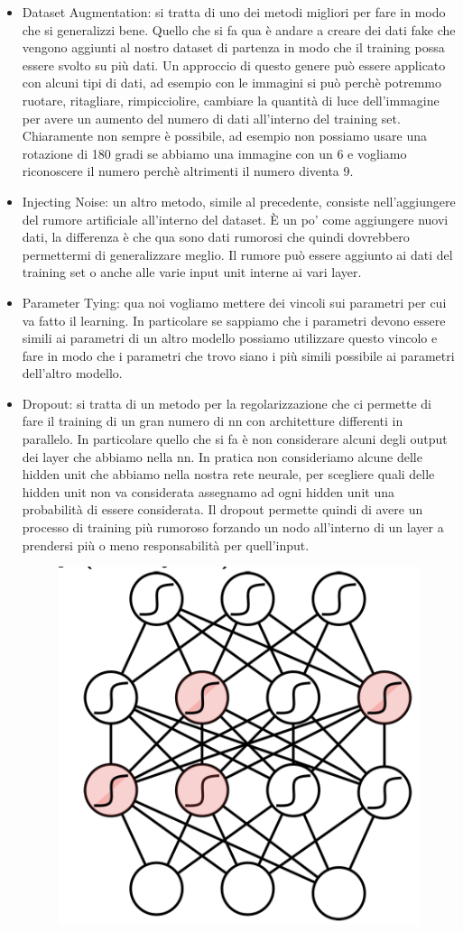 \documentclass[14pt]{extreport}
\begin{document}
\begin{itemize}
	\item Dataset Augmentation: si tratta di uno dei metodi migliori per fare in modo 
	che si generalizzi bene. Quello che si fa qua è andare a creare dei dati fake che vengono aggiunti al 
	nostro dataset di partenza in modo che il training possa essere svolto su più dati.
	Un approccio di questo genere può essere applicato con alcuni tipi di dati, ad esempio con le immagini si può 
	perchè potremmo ruotare, ritagliare, rimpicciolire, cambiare la quantità di luce dell'immagine per avere un aumento del
	numero di dati all'interno del training set. Chiaramente non sempre è possibile, ad esempio non possiamo usare una rotazione di 180 gradi 
	se abbiamo una immagine con un 6 e vogliamo riconoscere il numero perchè altrimenti il numero diventa 9.
	\item Injecting Noise: un altro metodo, simile al precedente, consiste nell'aggiungere del rumore artificiale all'interno del 
	dataset. È un po' come aggiungere nuovi dati, la differenza è che qua sono dati rumorosi che quindi dovrebbero permettermi di generalizzare meglio.
	Il rumore può essere aggiunto ai dati del training set o anche alle varie input unit interne ai vari layer.
	\item Parameter Tying: qua noi vogliamo mettere dei vincoli sui parametri per cui va fatto il learning. In particolare se sappiamo che i parametri devono 
	essere simili ai parametri di un altro modello possiamo utilizzare questo vincolo e fare in modo che i parametri che trovo siano i più simili possibile ai parametri 
	dell'altro modello.
	\item Dropout: si tratta di un metodo per la regolarizzazione che ci permette di fare il training di un gran numero di nn con architetture differenti in parallelo.
	In particolare quello che si fa è non considerare alcuni degli output dei layer che abbiamo nella nn.
	In pratica non consideriamo alcune delle hidden unit che abbiamo nella nostra rete neurale, per scegliere quali delle hidden unit non va considerata
	assegnamo ad ogni hidden unit una probabilità di essere considerata.
	Il dropout permette quindi di avere un processo di training più rumoroso forzando un nodo all'interno di un layer a prendersi più o meno responsabilità per quell'input.
	\begin{figure}[H]
		\centering
		\includegraphics[width=0.7\linewidth]{428.jpeg}

\end{figure}
\end{itemize}
\end{document}
